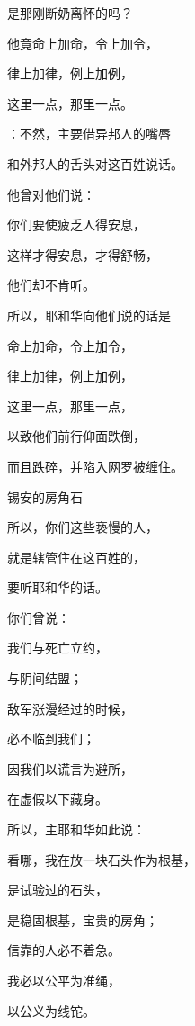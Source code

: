 {\par }{\Q 是那刚断奶离怀的吗？
\par }{\Q {}他竟命上加命，令上加令，
\par }{\Q 律上加律，例上加例，
\par }{\Q 这里一点，那里一点。
\par }{\BB \par }{\Q {}：不然，主要借异邦人的嘴唇
\par }{\Q 和外邦人的舌头对这百姓说话。
\par }{\Q {}他曾对他们说：
\par }{\Q 你们要使疲乏人得安息，
\par }{\Q 这样才得安息，才得舒畅，
\par }{\Q 他们却不肯听。
\par }{\Q {}所以，耶和华向他们说的话是
\par }{\Q 命上加命，令上加令，
\par }{\Q 律上加律，例上加例，
\par }{\Q 这里一点，那里一点，
\par }{\Q 以致他们前行仰面跌倒，
\par }{\Q 而且跌碎，并陷入网罗被缠住。
\par }{\SH 锡安的房角石
\par }{\Q {}所以，你们这些亵慢的人，
\par }{\Q 就是辖管住在{}这百姓的，
\par }{\Q 要听耶和华的话。
\par }{\Q {}你们曾说：
\par }{\Q 我们与死亡立约，
\par }{\Q 与阴间结盟；
\par }{\Q 敌军涨漫经过的时候，
\par }{\Q 必不临到我们；
\par }{\Q 因我们以谎言为避所，
\par }{\Q 在虚假以下藏身。
\par }{\Q {}所以，主耶和华如此说：
\par }{\Q 看哪，我在{}放一块石头作为根基，
\par }{\Q 是试验过的石头，
\par }{\Q 是稳固根基，宝贵的房角{}；
\par }{\Q 信靠的人必不着急。
\par }{\Q {}我必以公平为准绳，
\par }{\Q 以公义为线铊。
}
